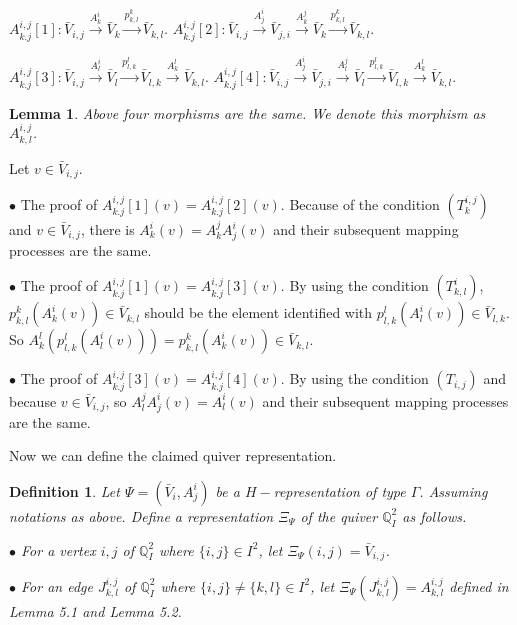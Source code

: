 \def\CTEXPreproc{Created by ctex v0.2.12, don't edit!}\documentclass[11pt]{article}
\newtheorem{lem}{Lemma}[section]
\newtheorem{defi}{Definition}[section]
\begin{document}
$A^{i,j}_{k.j}[1] : \bar{V}_{i,j} \stackrel{A^i _k }{\longrightarrow} \bar{V}_k  \stackrel{p^k _{k,l}}{\longrightarrow} \bar{V}_{k,l} $.
$A^{i,j}_{k.j}[2]: \bar{V}_{i,j} \stackrel{A^i _j }{\longrightarrow} \bar{V}_{j,i} \stackrel{A^j _k }{\longrightarrow} \bar{V}_k
 \stackrel{p^k _{k,l}}{\longrightarrow} \bar{V}_{k,l} $.

$A^{i,j}_{k.j}[3]: \bar{V}_{i,j} \stackrel{A^i _l }{\longrightarrow} \bar{V}_{l} \stackrel{p^l _{l,k}}{\longrightarrow} \bar{V}_{l,k}
 \stackrel{A^l _k }{\longrightarrow} \bar{V}_{k,l} $.
$A^{i,j}_{k.j}[4]: \bar{V}_{i,j} \stackrel{A^i _j }{\longrightarrow} \bar{V}_{j,i} \stackrel{A^j _l }{\longrightarrow} \bar{V}_l \stackrel{p^l _{l,k}}{\longrightarrow} \bar{V}_{l,k} \stackrel{A^l _k }{\longrightarrow} \bar{V}_{k,l} $.

\begin{lem}
Above four morphisms are the same. We denote this morphism as $A^{i,j}_{k,l}$.
\end{lem}

\begin{pf} Let $v\in \bar{V}_{i,j}$.

\noindent  $\bullet$ The proof of $ A^{i,j}_{k.j}[1](v) =A^{i,j}_{k.j}[2](v)$. Because of the  condition $(T^{i,j}_k )$ and $v\in \bar{V}_{i,j}$, there is
 $ A^i _k (v) = A^j _k A^i _j (v) $ and their subsequent mapping processes are the same.

\noindent$\bullet$ The proof of $ A^{i,j}_{k.j}[1](v) =A^{i,j}_{k.j}[3](v)$. By using the condition $( T^i _{k,l})$, $p^k _{k,l} (  A^i _k (v) )\in \bar{V}_{k,l} $
should be  the element identified with $ p^l _{l,k} ( A^i _l (v) ) \in \bar{V}_{l,k} $. So
 $A^l _k ( p^l _{l,k} ( A^i _l (v) ) )= p^k _{k,l} (  A^i _k (v) )\in \bar{V}_{k,l} $.

\noindent $\bullet$ The proof of $ A^{i,j}_{k.j}[3](v) =A^{i,j}_{k.j}[4](v)$. By using the condition $(T_{i,j})$ and because $v\in \bar{V}_{i,j}$, so
  $A^j _l A^i _j (v) = A^i _l (v) $ and their subsequent mapping processes are the same.\\


\end{pf}

Now we can define the claimed quiver representation.

\begin{defi}
 Let $\Psi = (\bar{V}_i , A^i _j) $ be a $H-$representation of type $\Gamma$. Assuming notations as above. Define a representation $\Xi_{\Psi} $ of the quiver
 $\mathbb{Q}^2 _{I}$ as follows.

\noindent $\bullet$ For a vertex ${i,j}$ of $\mathbb{Q}^2 _{I}$ where $\{ i,j\} \in I^2$, let $\Xi_{\Psi} ( {i,j} ) = \bar{V}_{i,j}$.

 \noindent $\bullet$ For an edge  $J^{i,j} _{ k,l }$ of $\mathbb{Q}^2 _{I}$ where $\{ i,j\}\neq \{ k,l\}  \in I^2$, let $\Xi_{\Psi} ( J^{i,j}_{k,l} ) = A^{i,j} _{k,l}$  defined in Lemma 5.1 and Lemma 5.2.

\end{defi}
\end{document}
